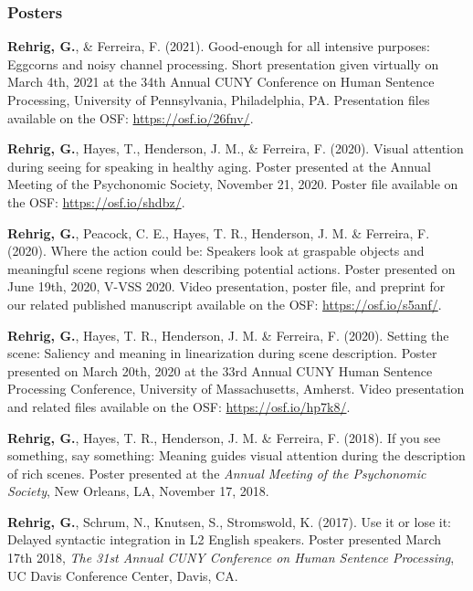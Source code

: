 \subsubsection*{Posters}

\textbf{Rehrig, G.}, \& Ferreira, F. (2021). Good-enough for all intensive purposes: Eggcorns and noisy channel processing. Short presentation given virtually on March 4th, 2021 at the 34th Annual CUNY Conference on Human Sentence Processing, University of Pennsylvania, Philadelphia, PA. Presentation files available on the OSF: \url{https://osf.io/26fnv/}. 

\textbf{Rehrig, G.}, Hayes, T., Henderson, J. M., \& Ferreira, F. (2020). Visual attention during seeing for speaking in healthy aging. Poster presented at the Annual Meeting of the Psychonomic Society, November 21, 2020. Poster file available on the OSF: \url{https://osf.io/shdbz/}. 

\textbf{Rehrig, G.}, Peacock, C. E., Hayes, T. R., Henderson, J. M. \& Ferreira, F. (2020). Where the action could be: Speakers look at graspable objects and meaningful scene regions when describing potential actions. Poster presented on June 19th, 2020, V-VSS 2020. Video presentation, poster file, and preprint for our related published manuscript available on the OSF: \url{https://osf.io/s5anf/}.

\textbf{Rehrig, G.}, Hayes, T. R., Henderson, J. M. \& Ferreira, F. (2020). Setting the scene: Saliency and meaning in linearization during scene description. Poster presented on March 20th, 2020 at the 33rd Annual CUNY Human Sentence Processing Conference, University of Massachusetts, Amherst. Video presentation and related files available on the OSF: \url{https://osf.io/hp7k8/}.

\textbf{Rehrig, G.}, Hayes, T. R., Henderson, J. M. \& Ferreira, F. (2018). If you see something, say something: Meaning guides visual attention during the description of rich scenes. Poster presented at the \textit{Annual Meeting of the Psychonomic Society}, New Orleans, LA, November 17, 2018.


\textbf{Rehrig, G.}, Schrum, N., Knutsen, S., Stromswold, K. (2017). Use it or lose it: Delayed syntactic integration in L2 English speakers. Poster presented March 17th 2018, \textit{The 31st Annual CUNY Conference on Human Sentence Processing}, UC Davis Conference Center, Davis, CA.



